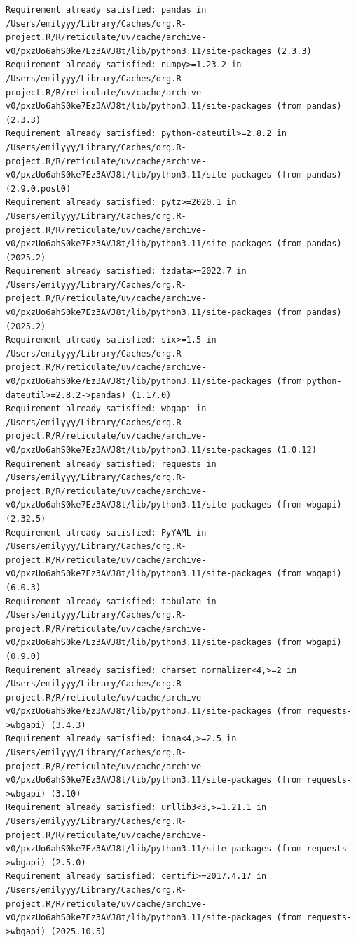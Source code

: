 \documentclass[
  letterpaper,
  DIV=11,
  numbers=noendperiod]{scrartcl}
\begin{document}
\begin{verbatim}
Requirement already satisfied: pandas in /Users/emilyyy/Library/Caches/org.R-project.R/R/reticulate/uv/cache/archive-v0/pxzUo6ahS0ke7Ez3AVJ8t/lib/python3.11/site-packages (2.3.3)
Requirement already satisfied: numpy>=1.23.2 in /Users/emilyyy/Library/Caches/org.R-project.R/R/reticulate/uv/cache/archive-v0/pxzUo6ahS0ke7Ez3AVJ8t/lib/python3.11/site-packages (from pandas) (2.3.3)
Requirement already satisfied: python-dateutil>=2.8.2 in /Users/emilyyy/Library/Caches/org.R-project.R/R/reticulate/uv/cache/archive-v0/pxzUo6ahS0ke7Ez3AVJ8t/lib/python3.11/site-packages (from pandas) (2.9.0.post0)
Requirement already satisfied: pytz>=2020.1 in /Users/emilyyy/Library/Caches/org.R-project.R/R/reticulate/uv/cache/archive-v0/pxzUo6ahS0ke7Ez3AVJ8t/lib/python3.11/site-packages (from pandas) (2025.2)
Requirement already satisfied: tzdata>=2022.7 in /Users/emilyyy/Library/Caches/org.R-project.R/R/reticulate/uv/cache/archive-v0/pxzUo6ahS0ke7Ez3AVJ8t/lib/python3.11/site-packages (from pandas) (2025.2)
Requirement already satisfied: six>=1.5 in /Users/emilyyy/Library/Caches/org.R-project.R/R/reticulate/uv/cache/archive-v0/pxzUo6ahS0ke7Ez3AVJ8t/lib/python3.11/site-packages (from python-dateutil>=2.8.2->pandas) (1.17.0)
Requirement already satisfied: wbgapi in /Users/emilyyy/Library/Caches/org.R-project.R/R/reticulate/uv/cache/archive-v0/pxzUo6ahS0ke7Ez3AVJ8t/lib/python3.11/site-packages (1.0.12)
Requirement already satisfied: requests in /Users/emilyyy/Library/Caches/org.R-project.R/R/reticulate/uv/cache/archive-v0/pxzUo6ahS0ke7Ez3AVJ8t/lib/python3.11/site-packages (from wbgapi) (2.32.5)
Requirement already satisfied: PyYAML in /Users/emilyyy/Library/Caches/org.R-project.R/R/reticulate/uv/cache/archive-v0/pxzUo6ahS0ke7Ez3AVJ8t/lib/python3.11/site-packages (from wbgapi) (6.0.3)
Requirement already satisfied: tabulate in /Users/emilyyy/Library/Caches/org.R-project.R/R/reticulate/uv/cache/archive-v0/pxzUo6ahS0ke7Ez3AVJ8t/lib/python3.11/site-packages (from wbgapi) (0.9.0)
Requirement already satisfied: charset_normalizer<4,>=2 in /Users/emilyyy/Library/Caches/org.R-project.R/R/reticulate/uv/cache/archive-v0/pxzUo6ahS0ke7Ez3AVJ8t/lib/python3.11/site-packages (from requests->wbgapi) (3.4.3)
Requirement already satisfied: idna<4,>=2.5 in /Users/emilyyy/Library/Caches/org.R-project.R/R/reticulate/uv/cache/archive-v0/pxzUo6ahS0ke7Ez3AVJ8t/lib/python3.11/site-packages (from requests->wbgapi) (3.10)
Requirement already satisfied: urllib3<3,>=1.21.1 in /Users/emilyyy/Library/Caches/org.R-project.R/R/reticulate/uv/cache/archive-v0/pxzUo6ahS0ke7Ez3AVJ8t/lib/python3.11/site-packages (from requests->wbgapi) (2.5.0)
Requirement already satisfied: certifi>=2017.4.17 in /Users/emilyyy/Library/Caches/org.R-project.R/R/reticulate/uv/cache/archive-v0/pxzUo6ahS0ke7Ez3AVJ8t/lib/python3.11/site-packages (from requests->wbgapi) (2025.10.5)
\end{verbatim}
\end{document}
